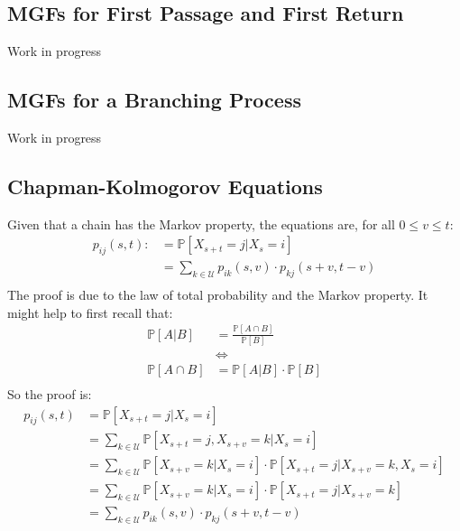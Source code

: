 \documentclass[12pt]{report}
\begin{document}
\subsection{MGFs for First Passage and First Return}
Work in progress
\subsection{MGFs for a Branching Process}
Work in progress
\subsection{Chapman-Kolmogorov Equations}
Given that a chain has the Markov property, the equations are, for all $0 \le v
\le t$:
\begin{equation*}
    \begin{aligned}
        p_{ij}(s, t) :&= \mathbb{P}\left[X_{s+t} = j | X_{s} = i\right] \\
                     &= \sum_{k\in\mathcal{U}} p_{ik}(s,v) \cdot p_{kj}(s+v,t-v)\\
    \end{aligned}
\end{equation*}
The proof is due to the law of total probability and the Markov property. It
might help to first recall that:
\begin{equation*}
    \begin{aligned}
        \mathbb{P}\left[A | B\right] &= \frac{ \mathbb{P}\left[A \cap B\right]}{ \mathbb{P}\left[B\right] } \\
            &\iff \\
        \mathbb{P}\left[A \cap B \right]  &=  \mathbb{P}\left[A | B\right] \cdot \mathbb{P}\left[B\right] \\
    \end{aligned}
\end{equation*}
So the proof is:
\begin{equation*}
    \begin{aligned}
        p_{ij}(s, t) &= \mathbb{P}\left[X_{s+t} = j | X_{s} = i\right] \\
            &= \sum_{k\in\mathcal{U}} \mathbb{P}\left[X_{s+t} = j, X_{s+v} = k | X_{s} = i\right]  \\
            &= \sum_{k\in\mathcal{U}} \mathbb{P}\left[ X_{s+v} = k | X_{s} = i \right] \cdot \mathbb{P}\left[ X_{s+t} = j | X_{s+v} = k, X_{s} = i\right]  \\
            &= \sum_{k\in\mathcal{U}} \mathbb{P}\left[ X_{s+v} = k | X_{s} = i \right] \cdot \mathbb{P}\left[ X_{s+t} = j | X_{s+v} = k\right]  \\
            &= \sum_{k\in\mathcal{U}} p_{ik}(s,v) \cdot p_{kj}(s+v,t-v)\\
    \end{aligned}
\end{equation*}
\end{document}
